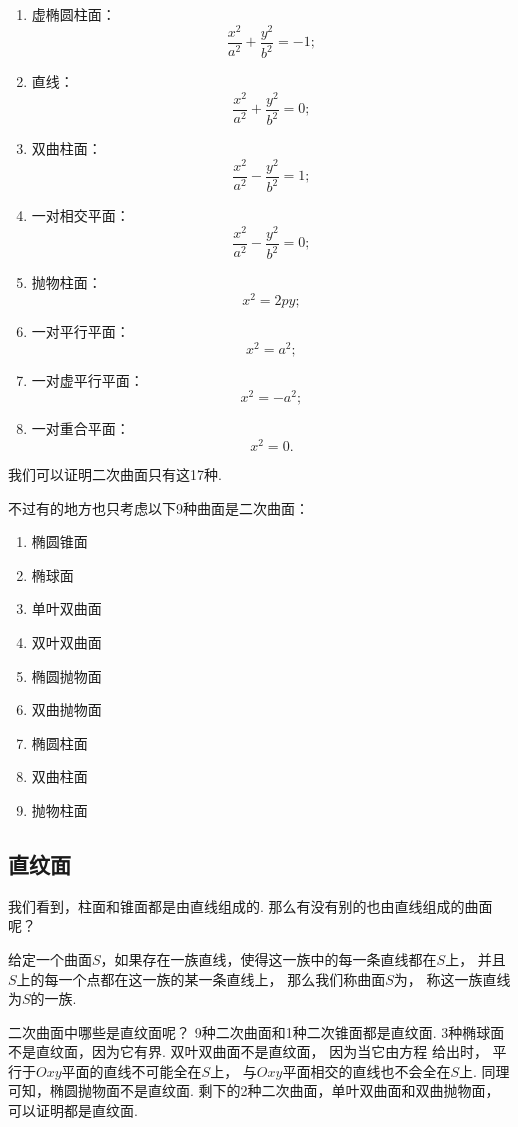 \begin{enumerate}[label={\chinese*.}]
\begin{enumerate}[label={\arabic*.}]
		\item 虚椭圆柱面：\[
			\frac{x^2}{a^2}+\frac{y^2}{b^2}=-1;
		\]

		\item 直线：\[
			\frac{x^2}{a^2}+\frac{y^2}{b^2}=0;
		\]

		\item 双曲柱面：\[
			\frac{x^2}{a^2}-\frac{y^2}{b^2}=1;
		\]

		\item 一对相交平面：\[
			\frac{x^2}{a^2}-\frac{y^2}{b^2}=0;
		\]

		\item 抛物柱面：\[
			x^2=2py;
		\]

		\item 一对平行平面：\[
			x^2=a^2;
		\]

		\item 一对虚平行平面：\[
			x^2=-a^2;
		\]

		\item 一对重合平面：\[
			x^2=0.
		\]
	\end{enumerate}
\end{enumerate}
我们可以证明二次曲面只有这17种.

不过有的地方也只考虑以下9种曲面是二次曲面：
\begin{enumerate}
	\item 椭圆锥面
	\item 椭球面
	\item 单叶双曲面
	\item 双叶双曲面
	\item 椭圆抛物面
	\item 双曲抛物面
	\item 椭圆柱面
	\item 双曲柱面
	\item 抛物柱面
\end{enumerate}

\subsection{直纹面}
我们看到，柱面和锥面都是由直线组成的.
那么有没有别的也由直线组成的曲面呢？

\begin{definition}
给定一个曲面\(S\)，如果存在一族直线，使得这一族中的每一条直线都在\(S\)上，
并且\(S\)上的每一个点都在这一族的某一条直线上，
那么我们称曲面\(S\)为，
称这一族直线为\(S\)的一族.
\end{definition}

二次曲面中哪些是直纹面呢？
9种二次曲面和1种二次锥面都是直纹面.
3种椭球面不是直纹面，因为它有界.
双叶双曲面不是直纹面，
因为当它由方程  给出时，
平行于\(Oxy\)平面的直线不可能全在\(S\)上，
与\(Oxy\)平面相交的直线也不会全在\(S\)上.
同理可知，椭圆抛物面不是直纹面.
剩下的2种二次曲面，单叶双曲面和双曲抛物面，可以证明都是直纹面.

